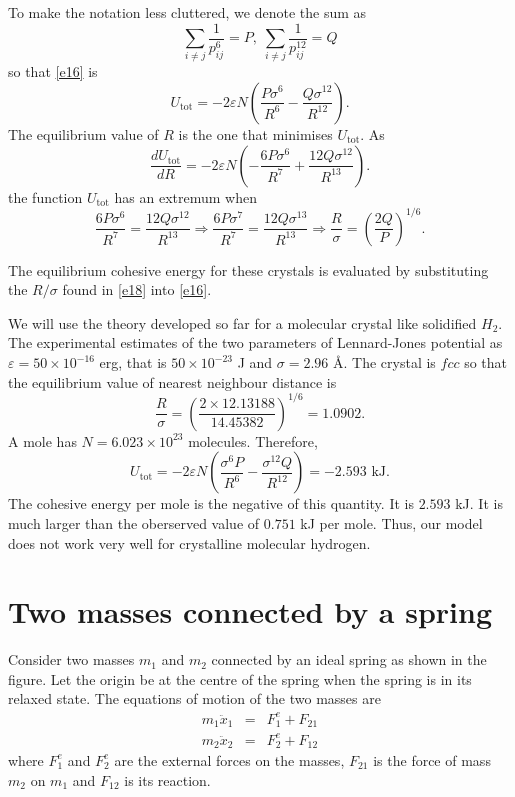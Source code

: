 \documentclass{article}
\begin{document}
To make the notation less cluttered, we denote the sum as
\begin{equation}\label{e17}
\sum_{i \ne j}\frac{1}{p_{ij}^6} = P, \;
\sum_{i \ne j}\frac{1}{p_{ij}^{12}} = Q
\end{equation}
so that \eqref{e16} is
\[
U_{\text{tot}} = -2\varepsilon N\left(\frac{P\sigma^6}{R^6} - \frac{Q\sigma^12}
{R^{12}}\right).
\]
The equilibrium value of $R$ is the one that minimises $U_\text{tot}$. As
\[
\frac{dU_{\text{tot}}}{dR} = -2\varepsilon N\left(-\frac{6P\sigma^6}{R^7} +
\frac{12Q\sigma^{12}}{R^{13}}\right).
\]
the function $U_\text{tot}$ has an extremum when
\begin{equation}\label{e18}
\frac{6P\sigma^6}{R^7} = \frac{12Q\sigma^{12}}{R^{13}} \Rightarrow
\frac{6P\sigma^7}{R^7} = \frac{12Q\sigma^{13}}{R^{13}} \Rightarrow
\frac{R}{\sigma} = \left(\frac{2Q}{P}\right)^{1/6}.
\end{equation}

The equilibrium cohesive energy for these crystals is evaluated by substituting
the $R/\sigma$ found in \eqref{e18} into \eqref{e16}.

We will use the theory developed so far for a molecular crystal like solidified
$H_2$. The experimental estimates of the two parameters of Lennard-Jones
potential as $\varepsilon = 50 \times 10^{-16}$ erg, that is $50 \times 10^{-23}
$ J and $\sigma = 2.96$ \AA. The crystal is $fcc$ so that the equilibrium
value of nearest neighbour distance is
\[
\frac{R}{\sigma} = \left(\frac{2 \times 12.13188}{14.45382}\right)^{1/6} = 
1.0902.
\]
A mole has $N = 6.023 \times 10^{23}$ molecules. Therefore,
\[
U_\text{tot} = -2\varepsilon N 
\left(\frac{\sigma^6P}{R^6} - \frac{\sigma^{12}Q}{R^{12}}\right) =
-2.593 \text{ kJ}.
\]
The cohesive energy per mole is the negative of this quantity. It is $2.593$ kJ.
It is much larger than the oberserved value of $0.751$ kJ per mole. Thus, our
model does not work very well for crystalline molecular hydrogen.

\section{Two masses connected by a spring}\label{s2}
Consider two masses $m_1$ and $m_2$ connected by an ideal spring as shown
in the figure. Let the origin be at the centre of the spring when the spring
is in its relaxed state. The equations of motion of the two masses are
\begin{eqnarray}
m_1\ddot{x}_1 &=& F_1^e + F_{21} \label{s2e1} \\
 m_2\ddot{x}_2 &=& F_2^e + F_{12} \label{s2e2}
\end{eqnarray}
where $F_1^e$ and $F_2^e$ are the external forces on the masses, $F_{21}$ is
the force of mass $m_2$ on $m_1$ and $F_{12}$ is its reaction. 
\end{document}
